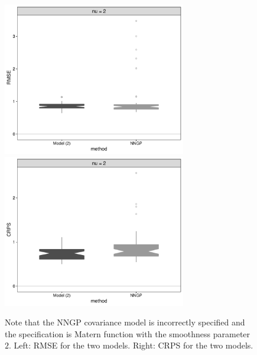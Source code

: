 \documentclass[
12pt, %
a4paper, %
oneside, %
headinclude,footinclude, %
BCOR5mm, %
]{scrartcl}
\begin{document}
  \begin{figure}[H]
    \includegraphics[width= 8cm]{./Figures/simuRMSE_2}
     \includegraphics[width= 8cm]{./Figures/simuCRPS_2}\\
  \caption{Note that the NNGP covariance model is incorrectly specified and the specification is Matern function with the smoothness parameter $2$. Left: RMSE for the two models. Right: CRPS for the two models.}
      \label{fgr:simulat2}
    \end{figure}
\end{document}
